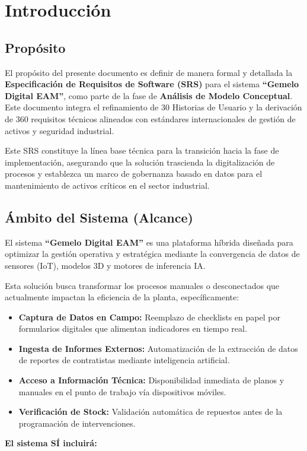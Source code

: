 \section{Introducción}

\subsection{Propósito}
El propósito del presente documento es definir de manera formal y detallada la \textbf{Especificación de Requisitos de Software (SRS)} para el sistema \textbf{``Gemelo Digital EAM''}, como parte de la fase de \textbf{Análisis de Modelo Conceptual}. Este documento integra el refinamiento de 30 Historias de Usuario y la derivación de 360 requisitos técnicos alineados con estándares internacionales de gestión de activos y seguridad industrial.

Este SRS constituye la línea base técnica para la transición hacia la fase de implementación, asegurando que la solución trascienda la digitalización de procesos y establezca un marco de gobernanza basado en datos para el mantenimiento de activos críticos en el sector industrial.

\subsection{Ámbito del Sistema (Alcance)}
El sistema \textbf{``Gemelo Digital EAM''} es una plataforma híbrida diseñada para optimizar la gestión operativa y estratégica mediante la convergencia de datos de sensores (IoT), modelos 3D y motores de inferencia IA.

Esta solución busca transformar los procesos manuales o desconectados que actualmente impactan la eficiencia de la planta, específicamente:

\begin{itemize}
    \item \textbf{Captura de Datos en Campo:} Reemplazo de checklists en papel por formularios digitales que alimentan indicadores en tiempo real.
    \item \textbf{Ingesta de Informes Externos:} Automatización de la extracción de datos de reportes de contratistas mediante inteligencia artificial.
    \item \textbf{Acceso a Información Técnica:} Disponibilidad inmediata de planos y manuales en el punto de trabajo vía dispositivos móviles.
    \item \textbf{Verificación de Stock:} Validación automática de repuestos antes de la programación de intervenciones.
\end{itemize}
\textbf{El sistema SÍ incluirá:}

